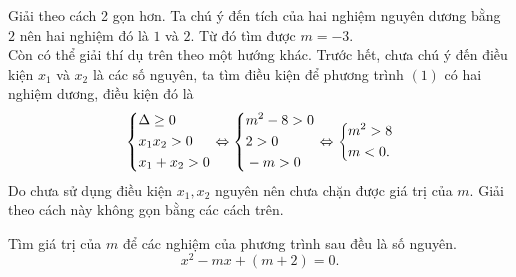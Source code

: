 \begin{vd}
{\begin{note}
Giải theo cách 2 gọn hơn. Ta chú ý đến tích của hai nghiệm nguyên dương bằng $2$ nên hai nghiệm đó là $1$ và $2$. Từ đó tìm được $m=-3$.\\
Còn có thể giải thí dụ trên theo một hướng khác. Trước hết, chưa chú ý đến điều kiện $x_1$ và $x_2$ là các số nguyên, ta tìm điều kiện để phương trình $(1)$ có hai nghiệm dương, điều kiện đó là
$$ \left\{\begin{aligned}&\Delta \ge 0\\&x_1x_2>0\\&x_1+x_2>0\end{aligned}\right.\Leftrightarrow \left\{\begin{aligned}&m^2-8>0\\&2>0\\&-m>0\end{aligned}\right.\Leftrightarrow \left\{\begin{aligned}&m^2>8\\&m<0.\end{aligned}\right. $$
Do chưa sử dụng điều kiện $x_1, x_2$ nguyên nên chưa chặn được giá trị của $m$. Giải theo cách này không gọn bằng các cách trên.
\end{note}
    }
\end{vd}




\begin{vd}
Tìm giá trị của $m$ để các nghiệm của phương trình sau đều là số nguyên.
\[ x^2-mx+(m+2)=0.\tag{2}\]
\end{vd}

